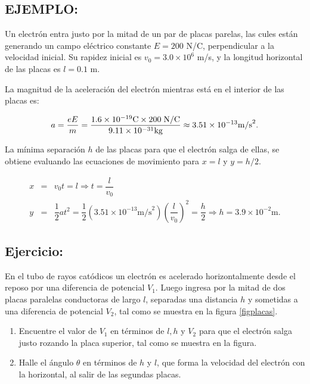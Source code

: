 \subsection*{EJEMPLO:} Un electrón entra justo por la mitad de un par de placas parelas, las cules están generando un campo eléctrico constante $E=200$ N/C, perpendicular a la velocidad inicial. Su rapidez inicial es $v_0=3.0 \times 10^6$ m/s,  y la longitud horizontal de las placas es $l=0.1$ m.

La magnitud de la aceleración del electrón mientras está en el interior de las placas es:

\begin{eqnarray*}
a=\dfrac{eE}{m}=\dfrac{1.6 \times 10^{-19} \mbox{C} \times 200 \hspace{0.1 cm} \mbox{N/C}}{9.11 \times 10^{-31} \mbox{kg}} \approx 3.51 \times 10^{-13} \mbox{m/s}^2 .
\end{eqnarray*}

La mínima separación $h$ de las placas para que el electrón salga de ellas, se obtiene evaluando las ecuaciones de movimiento para $x=l$ y $y=h/2$.

\begin{eqnarray}
\nonumber
x&=&v_0t=l \Rightarrow t=\dfrac{l}{v_0} \\ \nonumber
y&=&\dfrac{1}{2} a t^2 = \dfrac{1}{2} (3.51 \times 10^{-13} \mbox{m/s}^2) (\dfrac{l}{v_0})^2 = \dfrac{h}{2} \Rightarrow h=3.9 \times 10^{-2} \mbox{m}.
\end{eqnarray}

\subsection*{Ejercicio:}
En el tubo de rayos catódicos un electrón es acelerado horizontalmente desde el reposo por una diferencia de potencial $V_{1}$. Luego ingresa por la mitad de dos placas paralelas conductoras de largo $l$, separadas una distancia $h$ y sometidas a una diferencia de potencial $V_{2}$, tal como se muestra en la figura \ref{figplacas}.
\begin{enumerate}
\item Encuentre el valor de $V_1$ en términos de $l,h$ y $V_2$ para que el electrón salga justo rozando la placa superior, tal como se muestra en la figura.
\item Halle el ángulo $\theta$ en términos de $h$ y $l$, que forma la velocidad del electrón con la horizontal, al salir de las segundas placas.
\end{enumerate}

